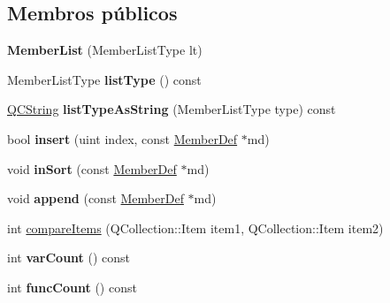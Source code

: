 \subsection*{Membros públicos}
\begin{DoxyCompactItemize}
\item 
\hypertarget{class_member_list_a0746462c45286ae27566d8937cccbe8b}{{\bfseries Member\-List} (Member\-List\-Type lt)}\label{class_member_list_a0746462c45286ae27566d8937cccbe8b}

\item 
\hypertarget{class_member_list_a126bbb7a1f64f312b822403ef4feff0b}{Member\-List\-Type {\bfseries list\-Type} () const }\label{class_member_list_a126bbb7a1f64f312b822403ef4feff0b}

\item 
\hypertarget{class_member_list_a2e82f47db139bbfee49b7666e66ebd9c}{\hyperlink{class_q_c_string}{Q\-C\-String} {\bfseries list\-Type\-As\-String} (Member\-List\-Type type) const }\label{class_member_list_a2e82f47db139bbfee49b7666e66ebd9c}

\item 
\hypertarget{class_member_list_a5ae140d3f0307a03df7fade72966a195}{bool {\bfseries insert} (uint index, const \hyperlink{class_member_def}{Member\-Def} $\ast$md)}\label{class_member_list_a5ae140d3f0307a03df7fade72966a195}

\item 
\hypertarget{class_member_list_a17db5d6eea83a53ba7c7b611af2b6c85}{void {\bfseries in\-Sort} (const \hyperlink{class_member_def}{Member\-Def} $\ast$md)}\label{class_member_list_a17db5d6eea83a53ba7c7b611af2b6c85}

\item 
\hypertarget{class_member_list_a3445f1cb9045aeb25dace8332c3ddf48}{void {\bfseries append} (const \hyperlink{class_member_def}{Member\-Def} $\ast$md)}\label{class_member_list_a3445f1cb9045aeb25dace8332c3ddf48}

\item 
int \hyperlink{class_member_list_a219450accf048597ffc7113ecde4c402}{compare\-Items} (Q\-Collection\-::\-Item item1, Q\-Collection\-::\-Item item2)
\item 
\hypertarget{class_member_list_ac684733d82b26133be4e6fd47443d83f}{int {\bfseries var\-Count} () const }\label{class_member_list_ac684733d82b26133be4e6fd47443d83f}

\item 
\hypertarget{class_member_list_a4993708d453535869dee1b8b99fcc71c}{int {\bfseries func\-Count} () const }\label{class_member_list_a4993708d453535869dee1b8b99fcc71c}


\end{DoxyCompactItemize}
